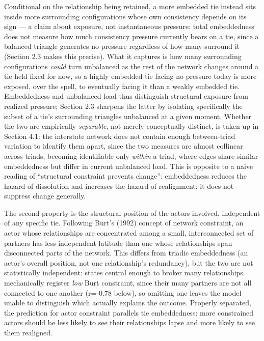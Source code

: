 \documentclass[Afour,sageh,times,doublespace]{sagej}
\begin{document}
Conditional on the relationship being retained, a more embedded tie instead sits inside more surrounding configurations whose own consistency depends on its sign --- a claim about exposure, not instantaneous pressure: total embeddedness does not measure how much consistency pressure currently bears on a tie, since a balanced triangle generates no pressure regardless of how many surround it (Section 2.3 makes this precise). What it captures is how many surrounding configurations \emph{could} turn unbalanced as the rest of the network changes around a tie held fixed for now, so a highly embedded tie facing no pressure today is more exposed, over the spell, to eventually facing it than a weakly embedded tie. Embeddedness and unbalanced load thus distinguish structural exposure from realized pressure; Section 2.3 sharpens the latter by isolating specifically the subset of a tie's surrounding triangles unbalanced at a given moment. Whether the two are empirically \emph{separable}, not merely conceptually distinct, is taken up in Section 4.1: the interstate network does not contain enough between-triad variation to identify them apart, since the two measures are almost collinear across triads, becoming identifiable only \emph{within} a triad, where edges share similar embeddedness but differ in current unbalanced load. This is opposite to a naive reading of ``structural constraint prevents change'': embeddedness reduces the hazard of dissolution and increases the hazard of realignment; it does not suppress change generally.

The second property is the structural position of the actors involved, independent of any specific tie. Following Burt's (1992) concept of network constraint, an actor whose relationships are concentrated among a small, interconnected set of partners has less independent latitude than one whose relationships span disconnected parts of the network. This differs from triadic embeddedness (an actor's overall position, not one relationship's redundancy), but the two are not statistically independent: states central enough to broker many relationships mechanically register \emph{low} Burt constraint, since their many partners are not all connected to one another (r=-0.78 below), so omitting one leaves the model unable to distinguish which actually explains the outcome. Properly separated, the prediction for actor constraint parallels tie embeddedness: more constrained actors should be less likely to see their relationships lapse and more likely to see them realigned.
\end{document}
